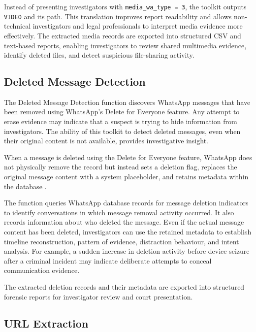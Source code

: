 \documentclass[12pt,a4paper]{report}
\begin{document}
Instead of presenting investigators with \texttt{media\_wa\_type = 3}, the toolkit outputs \texttt{VIDEO} and its path. This translation improves report readability and allows non-technical investigators and legal professionals to interpret media evidence more effectively. The extracted media records are exported into structured CSV and text-based reports, enabling investigators to review shared multimedia evidence, identify deleted files, and detect suspicious file-sharing activity.

\subsection{Deleted Message Detection}

The Deleted Message Detection function discovers WhatsApp messages that have been removed using WhatsApp's Delete for Everyone feature. Any attempt to erase evidence may indicate that a suspect is trying to hide information from investigators. The ability of this toolkit to detect deleted messages, even when their original content is not available, provides investigative insight.

When a message is deleted using the Delete for Everyone feature, WhatsApp does not physically remove the record but instead sets a deletion flag, replaces the original message content with a system placeholder, and retains metadata within the database \citep{anglano2014,lekhac2022book}.

The function queries WhatsApp database records for message deletion indicators to identify conversations in which message removal activity occurred. It also records information about who deleted the message. Even if the actual message content has been deleted, investigators can use the retained metadata to establish timeline reconstruction, pattern of evidence, distraction behaviour, and intent analysis. For example, a sudden increase in deletion activity before device seizure after a criminal incident may indicate deliberate attempts to conceal communication evidence.

The extracted deletion records and their metadata are exported into structured forensic reports for investigator review and court presentation.

\subsection{URL Extraction}
\end{document}
